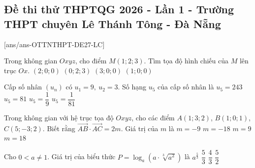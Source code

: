 
\subsection*{Đề thi thử THPTQG 2026 - Lần 1 - Trường THPT chuyên Lê Thánh Tông - Đà Nẵng }%
[ans/ans-OTTNTHPT-DE27-LC]
\caulc
\begin{ex}%
	Trong không gian $Oxyz$, cho điểm $M(1;2;3)$. Tìm tọa độ hình chiếu của $M$ lên trục $Ox$.
	\choice
	{$(2;0;0)$}
	{$(0;2;3)$}
	{$(3;0;0)$}
	{\True $(1;0;0)$}
\end{ex}

\begin{ex}%
	Cấp số nhân $(u_n)$ có $u_1=9,\ u_2=3$. Số hạng $u_5$ của cấp số nhân là
	\choice
	{$u_5=243$}
	{$u_5=81$}
	{\True $u_5=\dfrac{1}{9}$}
	{$u_5=\dfrac{1}{81}$}
\end{ex}

\begin{ex}%
	Trong không gian với hệ trục tọa độ $Oxyz$, cho các điểm	
	$A(1;3;2)$, $B(1;0;1)$, $C(5;-3;2)$.	
	Biết rằng $\vec{AB}\cdot\vec{AC}=2m$. Giá trị của $m$ là
	\choice
	{$m=-9$}
	{$m=-18$}
	{\True $m=9$}
	{$m=18$}
\end{ex}

\begin{ex}%
	Cho $0<a\ne1$. Giá trị của biểu thức
	$
	P=\log_{a}\left(a\cdot\sqrt[3]{a^2}\right)
	$
	là
	\choice
	{ $a^{\tfrac{5}{3}}$}
	{\True $\dfrac{5}{3}$}
	{$\dfrac{4}{3}$}
	{$\dfrac{5}{2}$}
\end{ex}

